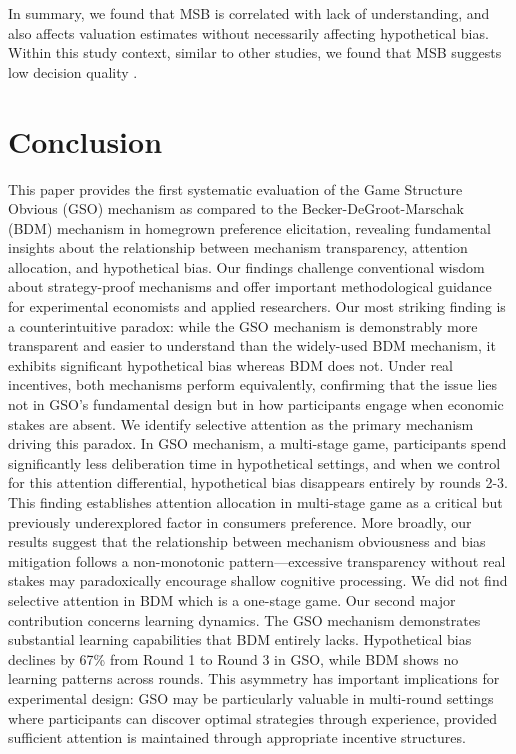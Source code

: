 \documentclass[12pt]{article}
\begin{document}
In summary, we found that MSB is correlated with lack of understanding, and also affects valuation estimates without necessarily affecting hypothetical bias. Within this study context, similar to other studies, we found that MSB suggests low decision quality \citep{charness2013experimental, yu2021multiple}.




\section{Conclusion}
\label{Conclusion}

This paper provides the first systematic evaluation of the Game Structure Obvious (GSO) mechanism as compared to the Becker-DeGroot-Marschak (BDM) mechanism in homegrown preference elicitation, revealing fundamental insights about the relationship between mechanism transparency, attention allocation, and hypothetical bias. Our findings challenge conventional wisdom about strategy-proof mechanisms and offer important methodological guidance for experimental economists and applied researchers.
Our most striking finding is a counterintuitive paradox: while the GSO mechanism is demonstrably more transparent and easier to understand than the widely-used BDM mechanism, it exhibits significant hypothetical bias whereas BDM does not. Under real incentives, both mechanisms perform equivalently, confirming that the issue lies not in GSO's fundamental design but in how participants engage when economic stakes are absent.
We identify selective attention as the primary mechanism driving this paradox. In GSO mechanism, a multi-stage game, participants spend significantly less deliberation time in hypothetical settings, and when we control for this attention differential, hypothetical bias disappears entirely by rounds 2-3. This finding establishes attention allocation in multi-stage game as a critical but previously underexplored factor in consumers preference. More broadly, our results suggest that the relationship between mechanism obviousness and bias mitigation follows a non-monotonic pattern—excessive transparency without real stakes may paradoxically encourage shallow cognitive processing. We did not find selective attention in BDM which is a one-stage game.
Our second major contribution concerns learning dynamics. The GSO mechanism demonstrates substantial learning capabilities that BDM entirely lacks. Hypothetical bias declines by 67\% from Round 1 to Round 3 in GSO, while BDM shows no learning patterns across rounds. This asymmetry has important implications for experimental design: GSO may be particularly valuable in multi-round settings where participants can discover optimal strategies through experience, provided sufficient attention is maintained through appropriate incentive structures.
\end{document}
